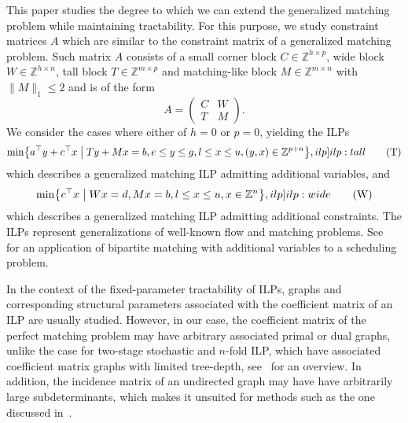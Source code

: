 \documentclass[a4paper,UKenglish,cleveref,thm-restate]{lipics-v2021}
\newcommand{\Z}{\mathbb Z}
\begin{document}
This paper studies the degree to which we can extend the generalized matching problem while maintaining tractability. For this purpose, we study constraint matrices $A$ which are similar to the constraint matrix of a generalized matching problem. Such matrix $A$ consists of a small corner block $C\in\Z^{h\times p}$, wide block $W\in\Z^{h\times n}$, tall block $T\in\Z^{m\times p}$ and matching-like block $M\in\Z^{m\times n}$ with $\|M\|_1\le2$ and is of the form
\[
    A=\begin{pmatrix}
        C&W\\
        T&M
    \end{pmatrix}.
\]
We consider the cases where either of $h=0$ or $p=0$, yielding the ILPs
\begin{equation}
    \min\bigl\{a^\top y+c^\top x\bigm\vert Ty+Mx=b,e\le y\le g,l\le x\le u,(y,x)\in\Z^{p+n}\bigr\},
    \label[ilp]{ilp:tall}\tag{T}
\end{equation}
which describes a generalized matching ILP admitting additional variables, and
\begin{equation}
    \min\bigl\{c^\top x\bigm\vert Wx=d,Mx=b,l\le x\le u,x\in\Z^n\bigr\},
    \label[ilp]{ilp:wide}\tag{W}
\end{equation}
which describes a generalized matching ILP admitting additional constraints. The ILPs  represent generalizations of well-known flow and matching problems. See~\cite{DBLP:journals/networks/BalasP83} for an application of bipartite matching with additional variables to a scheduling problem.

In the context of the fixed-parameter tractability of ILPs, graphs and corresponding structural parameters associated with the coefficient matrix of an ILP are usually studied. However, in our case, the coefficient matrix of the perfect matching problem may have arbitrary associated primal or dual graphs, unlike the case for two-stage stochastic and $n$-fold ILP, which have associated coefficient matrix graphs with limited tree-depth, see~\cite{eisenbrand2022algorithmictheoryintegerprogramming} for an overview. In addition, the incidence matrix of an undirected graph may have have arbitrarily large subdeterminants, which makes it unsuited for methods such as the one discussed in~\cite{DBLP:conf/focs/FioriniJWY21}.
\end{document}
